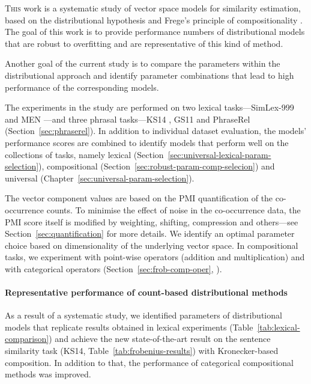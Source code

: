 \documentclass[11pt,a4paper,english,oneside]{book}
\newcommand\newcite\citet
\renewcommand\cite\citep
\begin{document}
\lettrine[lines=5,loversize=0.25]{T}{his} work is a systematic study of vector space models for similarity estimation, based on the distributional hypothesis \cite{harris1954distributional} and Frege's principle of compositionality \cite{Janssen2001,DBLP:journals/corr/abs-1003-4394}. The goal of this work is to provide performance numbers of distributional models that are robust to overfitting and are representative of this kind of method.

Another goal of the current study is to compare the parameters within the distributional approach and identify parameter combinations that lead to high performance of the corresponding models.

The experiments in the study are performed on two lexical tasks---SimLex-999 \cite{hill2014simlex} and MEN \cite{Bruni:2014:MDS:2655713.2655714}---and three phrasal tasks---KS14 \cite{kartsadrqpl2014}, GS11 \cite{Grefenstette:2011:ETV:2140490.2140497} and PhraseRel (Section~\ref{sec:phraserel}). In addition to individual dataset evaluation, the models' performance scores are combined to identify models that perform well on the collections of tasks, namely lexical (Section~\ref{sec:universal-lexical-param-selection}), compositional (Section~\ref{sec:robust-param-comp-selecion}) and universal (Chapter~\ref{sec:universal-param-selection}).

The vector component values are based on the PMI quantification of the co-occurrence counts. To minimise the effect of noise in the co-occurrence data, the PMI score itself is modified by weighting, shifting, compression and others---see Section~\ref{sec:quantification} for more details. We identify an optimal parameter choice based on dimensionality of the underlying vector space. In compositional tasks, we experiment with point-wise operators (addition and multiplication) and with categorical operators (Section~\ref{sec:frob-comp-oper}, \newcite{DBLP:journals/corr/abs-1003-4394}).

\paragraph{Representative performance of count-based distributional methods}

As a result of a systematic study, we identified parameters of distributional models that replicate results obtained in lexical experiments (Table~\ref{tab:lexical-comparison}) and achieve the new state-of-the-art result on the sentence similarity task (KS14, Table~\ref{tab:frobenius-results}) with Kronecker-based composition. In addition to that, the performance of categorical compositional methods was improved.
\end{document}
